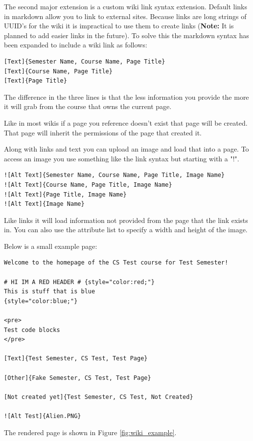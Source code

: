 \documentclass[11pt]{report}
\begin{document}
The second major extension is a custom wiki link syntax extension. Default links in markdown allow
you to link to external sites. Because links are long strings of UUID's for the wiki it is impractical
to use them to create links (\textbf{Note:} It is planned to add easier links in the future). To solve 
this the markdown syntax has been expanded to include a wiki link as follows:

\begin{verbatim}
[Text]{Semester Name, Course Name, Page Title}
[Text]{Course Name, Page Title}
[Text]{Page Title}
\end{verbatim} 

The difference in the three lines is that the less information you provide the more it will grab from
the course that owns the current page.

Like in most wikis if a page you reference doesn't exist that page will be created. That page will inherit
the permissions of the page that created it. 

Along with links and text you can upload an image and load that into a page. To access an image you use
something like the link syntax but starting with a "!".

\begin{verbatim}
![Alt Text]{Semester Name, Course Name, Page Title, Image Name}
![Alt Text]{Course Name, Page Title, Image Name}
![Alt Text]{Page Title, Image Name}
![Alt Text]{Image Name}
\end{verbatim}

Like links it will load information not provided from the page that the link exists in. You can also use
the attribute list to specify a width and height of the image.

\pagebreak
\noindent Below is a small example page:
\begin{verbatim}
Welcome to the homepage of the CS Test course for Test Semester!

# HI IM A RED HEADER # {style="color:red;"}
This is stuff that is blue
{style="color:blue;"}

<pre>
Test code blocks
</pre>

[Text]{Test Semester, CS Test, Test Page} 

[Other]{Fake Semester, CS Test, Test Page}

[Not created yet]{Test Semester, CS Test, Not Created}

![Alt Test]{Alien.PNG}
\end{verbatim}

The rendered page is shown in Figure \ref{fig:wiki_example}.
\end{document}
